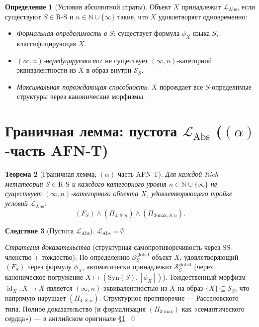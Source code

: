 \documentclass[11pt]{article}
\theoremstyle{plain}
\newtheorem{theorem}{Теорема}[section]
\newtheorem{corollary}[theorem]{Следствие}
\theoremstyle{definition}
\newtheorem{definition}[theorem]{Определение}
\newcommand{\RS}{\mathrm{R\text{-}S}}
\newcommand{\cS}{\mathcal{S}}
\newcommand{\LAbs}{\mathcal{L}_{\mathrm{Abs}}}
\newcommand{\Syn}{\mathrm{Syn}}
\DeclareMathOperator{\id}{id}
\begin{document}
\begin{definition}[Условия абсолютной страты]\label{def:level6}
Объект $X$ принадлежит $\LAbs$, если существуют $S \in \RS$ и $n \in \mathbb{N} \cup \{\infty\}$ такие, что $X$ удовлетворяет одновременно:
\begin{itemize}
\item[$(F_S)$] \emph{Формальная определимость в $S$}: существует формула $\phi_X$ языка $S$, классифицирующая $X$.
\item[$(\Pi_{4, S, n})$] \emph{$(\infty, n)$-нередуцируемость}: не существует $(\infty, n)$-категорной эквивалентности из $X$ в образ внутри $\cS_S$.
\item[$(\Pi_{3\text{-max}, S, n})$] \emph{Максимальная порождающая способность}: $X$ порождает все $S$-определимые структуры через канонические морфизмы.
\end{itemize}
\end{definition}

\section{Граничная лемма: пустота $\LAbs$ ($(\alpha)$-часть AFN-T)}\label{sec:afnt-alpha}

\begin{theorem}[Граничная лемма; $(\alpha)$-часть AFN-T]\label{thm:afnt-alpha}
Для каждой Rich-метатеории $S \in \RS$ и каждого категорного уровня $n \in \mathbb{N} \cup \{\infty\}$ не существует $(\infty, n)$-категорного объекта $X$, удовлетворяющего тройке условий $\LAbs$:
\[
(F_S) \wedge (\Pi_{4, S, n}) \wedge (\Pi_{3\text{-max}, S, n}).
\]
\end{theorem}

\begin{corollary}[Пустота $\LAbs$]\label{cor:level6-empty-alpha}
$\LAbs = \emptyset$.
\end{corollary}

\emph{Стратегия доказательства} (структурная самопротиворечивость через SS-членство + тождество): По определению $\cS_S^\mathrm{global}$ объект $X$, удовлетворяющий $(F_S)$ через формулу $\phi_X$, автоматически принадлежит $\cS_S^\mathrm{global}$ (через каноническое погружение $X \mapsto (\Syn(S), [\phi_X])$). Тождественный морфизм $\id_X : X \to X$ является $(\infty, n)$-эквивалентностью из $X$ на образ $\{X\} \subseteq \cS_S$, что напрямую нарушает $(\Pi_{4, S, n})$. Структурное противоречие — Расселовского типа. Полное доказательство (и формализация $(\Pi_{3\text{-max}})$ как «семантического сердца») — в английском оригинале \S\ref{sec:afnt-alpha}. \qed
\end{document}
